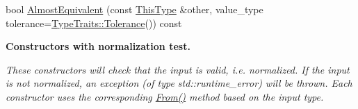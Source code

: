 \begin{DoxyCompactItemize}
\item 
bool \hyperlink{classvct_matrix_rotation2_base_aa5ab58d84256201af2c8a019e87121b3}{Almost\-Equivalent} (const \hyperlink{classvct_matrix_rotation2_base_a47ffeef2ddecede4b16bcc88fb432ff5}{This\-Type} \&other, value\-\_\-type tolerance=\hyperlink{classcmn_type_traits_adc129bf9867295b90d300768b780fa99}{Type\-Traits\-::\-Tolerance}()) const 
\end{DoxyCompactItemize}
\begin{Indent}{\bf Constructors with normalization test.}\par
{\em These constructors will check that the input is valid, i.\-e. normalized. If the input is not normalized, an exception (of type {\ttfamily std\-::runtime\-\_\-error}) will be thrown. Each constructor uses the corresponding \hyperlink{classvct_matrix_rotation2_base_a73d45665d2dd263429022f275f04b983}{From()} method based on the input type.

}
\end{Indent}
